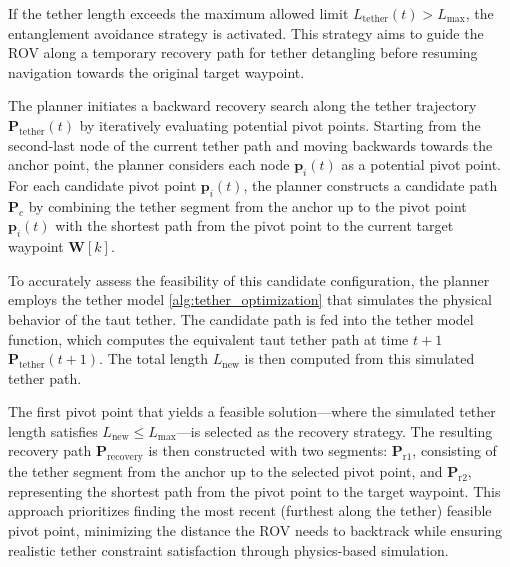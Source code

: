 If the tether length exceeds the maximum allowed limit $L_{\text{tether}}(t) > L_{\text{max}}$, the entanglement avoidance strategy is activated. This strategy aims to guide the ROV along a temporary recovery path for tether detangling before resuming navigation towards the original target waypoint.

The planner initiates a backward recovery search along the tether trajectory $\mathbf{P}_{\mathrm{tether}}(t)$ by iteratively evaluating potential pivot points. Starting from the second-last node of the current tether path and moving backwards towards the anchor point, the planner considers each node $\mathbf{p}_i(t)$ as a potential pivot point. For each candidate pivot point $\mathbf{p}_i(t)$, the planner constructs a candidate path $\mathbf{P}_c$ by combining the tether segment from the anchor up to the pivot point $\mathbf{p}_i(t)$ with the shortest path from the pivot point to the current target waypoint $\mathbf{W}[k]$.

To accurately assess the feasibility of this candidate configuration, the planner employs the tether model \ref{alg:tether_optimization} that simulates the physical behavior of the taut tether. The candidate path is fed into the tether model function, which computes the equivalent taut tether path at time $t+1$ $\mathbf{P}_{\mathrm{tether}}(t+1)$. The total length $L_{\text{new}}$ is then computed from this simulated tether path.

The first pivot point that yields a feasible solution—where the simulated tether length satisfies $L_{\text{new}} \leq L_{\text{max}}$—is selected as the recovery strategy. The resulting recovery path $\mathbf{P}_{\text{recovery}}$ is then constructed with two segments: $\mathbf{P}_{\text{r}1}$, consisting of the tether segment from the anchor up to the selected pivot point, and $\mathbf{P}_{\text{r}2}$, representing the shortest path from the pivot point to the target waypoint. This approach prioritizes finding the most recent (furthest along the tether) feasible pivot point, minimizing the distance the \ac{ROV} needs to backtrack while ensuring realistic tether constraint satisfaction through physics-based simulation.

